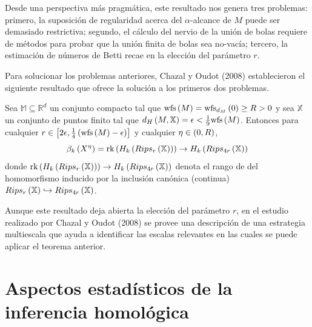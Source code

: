 Desde una perspectiva m\'as pragm\'atica, este resultado nos genera tres problemas: primero, la
suposici\'on de regularidad acerca del $\alpha$-alcance de $M$ puede ser demasiado restrictiva; segundo,
el c\'alculo del nervio de la uni\'on de bolas requiere de m\'etodos para probar que la uni\'on finita de
bolas sea no-vac\'ia; tercero, la estimaci\'on de n\'umeros de Betti recae en la elecci\'on del
par\'ametro $r$.

Para solucionar los problemas anteriores, Chazal y Oudot (2008) \cite{Chazaloudot2008} establecieron el
siguiente resultado que ofrece la soluci\'on a los primeros dos problemas.

\begin{teorema}
    Sea $\mathbb{M}\subseteq\mathbb{R}^{d}$ un conjunto compacto tal que $\mathrm{wfs}\left(M\right)=
    \mathrm{wfs}_{d_{M}}\left(0\right)\geq R>0$ y sea $\mathbb{X}$ un conjunto de puntos finito tal que
    $d_{H}\left(M,\mathbb{X}\right)=\epsilon <\frac{1}{9}\mathrm{wfs}\left(M\right)$. Entonces para cualquier
    $r\in \left[2\epsilon, \frac{1}{4}\left(\mathrm{wfs}\left(M\right)-\epsilon\right)\right]$ y cualquier
    $\eta\in\left(0,R\right)$,
    \begin{equation*}
        \beta_{k}\left(X^{\eta}\right) = \mathrm{rk}\left(H_{k}\left(Rips_{r}\left(\mathbb{X}\right)\right)\right)
        \rightarrow H_{k}\left(Rips_{4r}\left(\mathbb{X}\right)\right)
    \end{equation*}
    donde $\mathrm{rk}\left(H_{k}\left(Rips_{r}\left(\mathbb{X}\right)\right)\right)
    \rightarrow H_{k}\left(Rips_{4r}\left(\mathbb{X}\right)\right)$ denota el rango de del homomorfismo inducido
    por la inclusi\'on can\'onica (continua)
    $Rips_{r}\left(\mathbb{X}\right)\hookrightarrow Rips_{4r}\left(\mathbb{X}\right)$.
\end{teorema}

Aunque este resultado deja abierta la elecci\'on del par\'ametro $r$, en el estudio realizado por
Chazal y Oudot (2008) \cite{Chazaloudot2008} se provee una descripci\'on de una estrategia multiescala
que ayuda a identificar las escalas relevantes en las cuales se puede aplicar el teorema anterior.

\newpage

\section{Aspectos estad\'isticos de la inferencia homol\'ogica}

